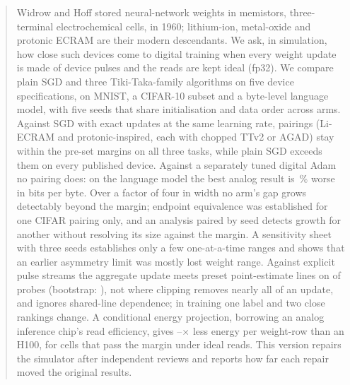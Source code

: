 \begin{abstract}
Widrow and Hoff stored neural-network weights in memistors, three-terminal electrochemical cells, in 1960; lithium-ion,
metal-oxide and protonic ECRAM are their modern descendants. We ask, in simulation, how close such devices come to digital
training when every weight update is made of device pulses and the reads are kept ideal (fp32). We compare plain SGD and three
Tiki-Taka-family algorithms on five device specifications, on MNIST, a CIFAR-10 subset and a byte-level language model, with five
seeds that share initialisation and data order across arms. Against SGD with exact updates at the same learning rate,
\RVAllThreeFpN{} pairings (Li-ECRAM and protonic-inspired, each with chopped TTv2 or AGAD) stay within the pre-set margins on all
three tasks, while plain SGD exceeds them on every published device. Against a separately tuned digital Adam no pairing does: on
the language model the best analog result is \RVLmAdamBestGap\,\% worse in bits per byte. Over a factor of four in width no
arm's gap grows detectably beyond the margin; endpoint equivalence was established for one CIFAR pairing only, and an analysis
paired by seed detects growth for another without resolving its size against the margin. A sensitivity sheet with three seeds establishes only a few one-at-a-time
ranges and shows that an earlier asymmetry limit was mostly lost weight range. Against explicit pulse streams the aggregate
update meets preset point-estimate lines on \RYProbeSurMeetsN{} of \RYProbeN{} probes (bootstrap:
\RYProbeSurAtNinetyFiveN), not where clipping removes nearly all of an
update, and ignores shared-line dependence; in training one label and two close rankings change. A conditional energy projection, borrowing an analog inference chip's read efficiency, gives
\RVenSysMin--\RVenChipMax$\times$ less energy per weight-row than an H100, for cells that pass the margin under ideal reads. This
version repairs the simulator after independent reviews and reports how far each repair moved the original results.
\end{abstract}
